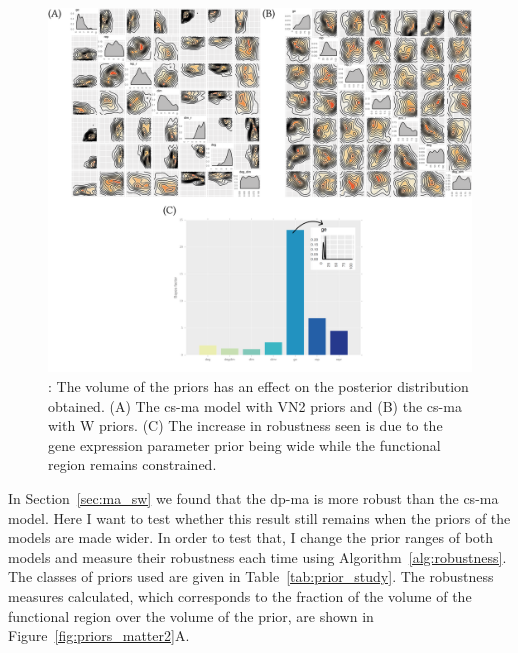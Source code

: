 \begin{figure}[h]
\begin{center}
\includegraphics[width=1.2\textwidth]{../../chapters/chapterStabilityFinder/images/priors_matter.png}
\caption[The volume of the priors has an effect on the posterior distribution obtained.]{ \label{fig:priors_matter}: The volume of the priors has an effect on the posterior distribution obtained. (A) The \acrshort{cs-ma} model with VN2 priors and (B) the \acrshort{cs-ma} with W priors. (C) The increase in robustness seen is due to the gene expression parameter prior being wide while the functional region remains constrained.}
\end{center}
\end{figure}



In Section~\ref{sec:ma_sw} we found that the \acrshort{dp-ma} is more robust than the \acrshort{cs-ma} model. Here I want to test whether this result still remains when the priors of the models are made wider. In order to test that, I change the prior ranges of both models and measure their robustness each time using Algorithm~\ref{alg:robustness}. The classes of priors used are given in Table~\ref{tab:prior_study}. The robustness measures calculated, which corresponds to the fraction of the volume of the functional region over the volume of the prior, are shown in Figure~\ref{fig:priors_matter2}A. 


